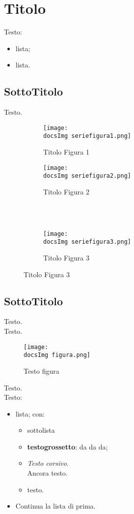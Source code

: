 \section{Titolo}{
	
	Testo:
	\begin{itemize}\itemsep1pt
		\item lista;
		\item lista.
	\end{itemize} 
	
	\subsection{SottoTitolo}{
		Testo.
		
		\begin{figure}[ht]
			\begin{subfigure}[b]{0.5\textwidth}
				\texttt{[image: \\docsImg seriefigura1.png]}
				\caption{Titolo Figura 1}
				\label{Titolo Figura 1}
			\end{subfigure}
			\begin{subfigure}[b]{0.5\textwidth}
				\texttt{[image: \\docsImg seriefigura2.png]}
				\caption{Titolo Figura 2}
				\label{Titolo Figura 2}
			\end{subfigure}
			\\
			\\
			\begin{subfigure}[b]{0.5\textwidth}
				\texttt{[image: \\docsImg seriefigura3.png]}
				\caption{Titolo Figura 3}
				\label{Titolo Figura 3}
			\end{subfigure}
		\end{figure}
	}
	\subsection{SottoTitolo}{
		Testo.
		\\
		Testo.
		\begin{figure}[ht]
			\centering
			\texttt{[image: \\docsImg figura.png]}
			\caption{Testo figura}
			\label{Testo figura}
		\end{figure}
		
		Testo.
		\\
		Testo:
		\begin{itemize}\itemsep1pt
			\item lista; con:
			\begin{itemize}\itemsep1pt
				\item sottolista
				\item \textbf{testogrossetto}: da da da;
				\item \textit{Testo corsivo}.\\ 
				Ancora testo.
				\item testo.
			\end{itemize}
			\item Continua la lista di prima.
		\end{itemize}
	}
}
